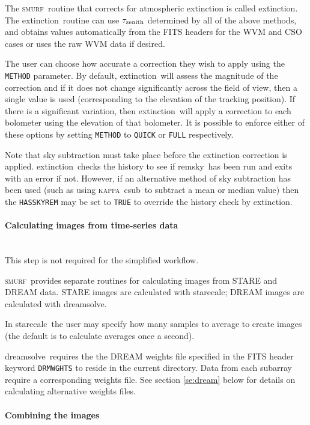 \documentclass[twoside,11pt]{article}
\newcommand{\xref}[3]{#1}
\newcommand{\xlabel}[1]{}
\renewcommand{\_}{\texttt{\symbol{95}}}
\newcommand{\KAPPA}{\textsc{kappa}}
\newcommand{\SMURF}{\textsc{smurf}}
\newcommand{\task}[1]{\textsf{#1}}
\newcommand{\dreamsolve}{\xref{\task{dreamsolve}}{sun258}{DREAMSOLVE}}
\newcommand{\starecalc}{\xref{\task{starecalc}}{sun258}{STARECALC}}
\newcommand{\extinction}{\xref{\task{extinction}}{sun258}{EXTINCTION}}
\newcommand{\remsky}{\xref{\task{remsky}}{sun258}{REMSKY}}
\newcommand{\csub}{\xref{\task{csub}}{sun95}{CSUB}}
\newcommand{\aparam}[1]{\texttt{#1}}     %
\begin{document}
The \SMURF\ routine that corrects for atmospheric extinction is called
\extinction. The \extinction\ routine can use $\tau_{\rm zenith}$
determined by all of the above methods, and obtains values
automatically from the FITS headers for the WVM and CSO cases or uses
the raw WVM data if desired.

The user can choose how accurate a correction they wish to apply using
the \aparam{METHOD} parameter. By default, \extinction\ will assess
the magnitude of the correction and if it does not change
significantly across the field of view, then a single value is used
(corresponding to the elevation of the tracking position). If there is
a significant variation, then \extinction\ will apply a correction to
each bolometer using the elevation of that bolometer. It is possible
to enforce either of these options by setting \aparam{METHOD} to
\texttt{QUICK} or \texttt{FULL} respectively.

Note that sky subtraction must take place before the extinction
correction is applied. \extinction\ checks the history to see if
\remsky\ has been run and exits with an error if not. However, if an
alternative method of sky subtraction has been used (such as using
\KAPPA\ \csub\ to subtract a mean or median value) then the
\aparam{HASSKYREM} may be set to \texttt{TRUE} to override the history
check by \extinction.

\paragraph{\xlabel{dsimages}Calculating images from time-series data\label{se:dsimages}} \ \\

This step is not required for the simplified workflow.

\SMURF\ provides separate routines for calculating images from STARE
and DREAM data. STARE images are calculated with \starecalc; DREAM
images are calculated with \dreamsolve. 

In \starecalc\ the user may specify how many samples to average to
create images (the default is to calculate averages once a second).

\dreamsolve\ requires the the DREAM weights file specified in the FITS
header keyword \texttt{DRMWGHTS} to reside in the current
directory. Data from each subarray require a corresponding weights
file. See section \ref{se:dream} below for details on calculating
alternative weights files.

\paragraph{\xlabel{mosaic}Combining the images\label{se:mosaic}} \ \\
\end{document}
